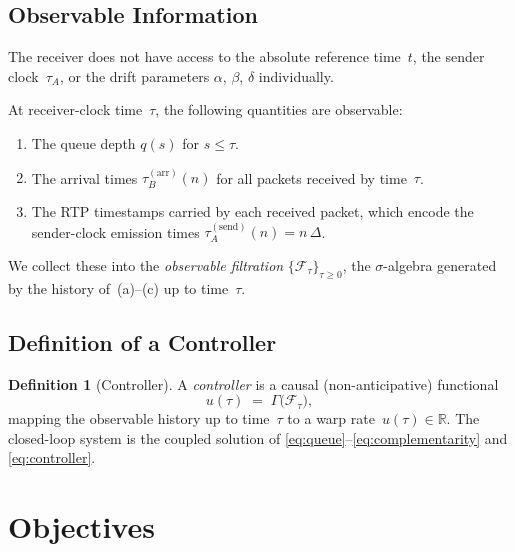 \documentclass[11pt, a4paper]{article}
\theoremstyle{definition}
\newtheorem{definition}{Definition}[section]
\theoremstyle{plain}
\theoremstyle{remark}
\newcommand{\R}{\mathbb{R}}
\begin{document}
\subsection{Observable Information}\label{sec:observables}

The receiver does not have access to the absolute reference time~$t$,
the sender clock~$\tau_A$, or the drift parameters $\alpha$, $\beta$,
$\delta$ individually.

At receiver-clock time~$\tau$, the following quantities are observable:
\begin{enumerate}[label=(\alph*)]
  \item The queue depth $q(s)$ for $s \le \tau$.
  \item The arrival times $\tau_B^{(\text{arr})}(n)$ for all packets
    received by time~$\tau$.
  \item The RTP timestamps carried by each received packet, which
    encode the sender-clock emission times
    $\tau_A^{(\text{send})}(n) = n\,\Delta$.
\end{enumerate}

We collect these into the \emph{observable filtration}
$\{\mathcal{F}_\tau\}_{\tau \ge 0}$, the $\sigma$-algebra generated
by the history of~(a)--(c) up to time~$\tau$.

\subsection{Definition of a Controller}\label{sec:controller-def}

\begin{definition}[Controller]\label{def:controller}
  A \emph{controller} is a causal (non-anticipative) functional
  \begin{equation}\label{eq:controller}
    u(\tau) \;=\; \Gamma\!\bigl(\mathcal{F}_\tau\bigr),
  \end{equation}
  mapping the observable history up to time~$\tau$ to a warp
  rate~$u(\tau) \in \R$.
  The closed-loop system is the coupled solution of
  \eqref{eq:queue}--\eqref{eq:complementarity} and
  \eqref{eq:controller}.
\end{definition}

\section{Objectives}\label{sec:objectives}
\end{document}
